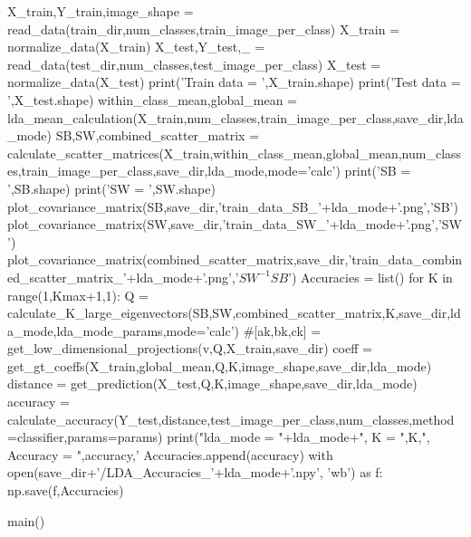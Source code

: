 \documentclass{article}
\begin{document}
\begin{python}
	X_train,Y_train,image_shape = read_data(train_dir,num_classes,train_image_per_class)
	X_train = normalize_data(X_train)
	X_test,Y_test,_ = read_data(test_dir,num_classes,test_image_per_class)
	X_test = normalize_data(X_test)
	print('Train data = ',X_train.shape)
	print('Test data = ',X_test.shape)
	within_class_mean,global_mean = lda_mean_calculation(X_train,num_classes,train_image_per_class,save_dir,lda_mode)
	SB,SW,combined_scatter_matrix = calculate_scatter_matrices(X_train,within_class_mean,global_mean,num_classes,train_image_per_class,save_dir,lda_mode,mode='calc')
	print('SB = ',SB.shape)
	print('SW = ',SW.shape)
	plot_covariance_matrix(SB,save_dir,'train_data_SB_'+lda_mode+'.png','SB')
	plot_covariance_matrix(SW,save_dir,'train_data_SW_'+lda_mode+'.png','SW')
	plot_covariance_matrix(combined_scatter_matrix,save_dir,'train_data_combined_scatter_matrix_'+lda_mode+'.png','$SW^{-1}SB$')
	Accuracies = list()
	for K in range(1,Kmax+1,1):
		Q = calculate_K_large_eigenvectors(SB,SW,combined_scatter_matrix,K,save_dir,lda_mode,lda_mode_params,mode='calc')
		#[ak,bk,ck] = get_low_dimensional_projections(v,Q,X_train,save_dir)
		coeff = get_gt_coeffs(X_train,global_mean,Q,K,image_shape,save_dir,lda_mode)
		distance = get_prediction(X_test,Q,K,image_shape,save_dir,lda_mode)
		accuracy = calculate_accuracy(Y_test,distance,test_image_per_class,num_classes,method=classifier,params=params)
		print("lda_mode = "+lda_mode+", K = ",K,", Accuracy = ",accuracy,'%
		Accuracies.append(accuracy)
		with open(save_dir+'/LDA_Accuracies_'+lda_mode+'.npy', 'wb') as f:
			np.save(f,Accuracies)

main()

\end{python}
\end{document}
